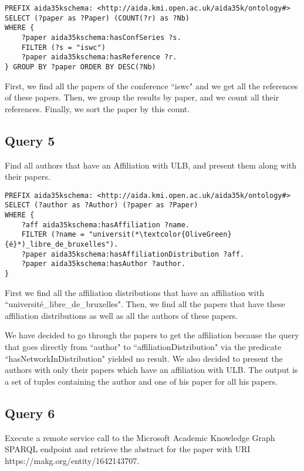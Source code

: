 \documentclass{article}[a4]
\begin{document}
\begin{lstlisting}[language=SPARQL]
PREFIX aida35kschema: <http://aida.kmi.open.ac.uk/aida35k/ontology#>
SELECT (?paper as ?Paper) (COUNT(?r) as ?Nb)
WHERE {
    ?paper aida35kschema:hasConfSeries ?s.
    FILTER (?s = "iswc")
    ?paper aida35kschema:hasReference ?r.
} GROUP BY ?paper ORDER BY DESC(?Nb)
\end{lstlisting}

First, we find all the papers of the conference ``iswc" and we get all the references of these papers. Then, we group the results by paper, and we count all their references. Finally, we sort the paper by this count.


\subsection{Query 5}
Find all authors that have an Affiliation with ULB, and present them along with their papers.

\begin{lstlisting}[language=SPARQL]
PREFIX aida35kschema: <http://aida.kmi.open.ac.uk/aida35k/ontology#>
SELECT (?author as ?Author) (?paper as ?Paper)
WHERE {
    ?aff aida35kschema:hasAffiliation ?name.
    FILTER (?name = "universit(*\textcolor{OliveGreen}{é}*)_libre_de_bruxelles").
    ?paper aida35kschema:hasAffiliationDistribution ?aff.
    ?paper aida35kschema:hasAuthor ?author.
}
\end{lstlisting}

First we find all the affiliation distributions that have an affiliation with ``université\_libre\_de\_bruxelles". Then, we find all the papers that have these affiliation distributions as well as all the authors of these papers.

We have decided to go through the papers to get the affiliation because the query that goes directly from ``author" to ``affiliationDistribution" via the predicate ``hasNetworkInDistribution" yielded no result. We also decided to present the authors with only their papers which have an affiliation with ULB. The output is a set of tuples containing the author and one of his paper for all his papers.


\subsection{Query 6}
Execute a remote service call to the Microsoft Academic Knowledge Graph SPARQL endpoint and retrieve the abstract for the paper with URI https://makg.org/entity/1642143707.
\end{document}
